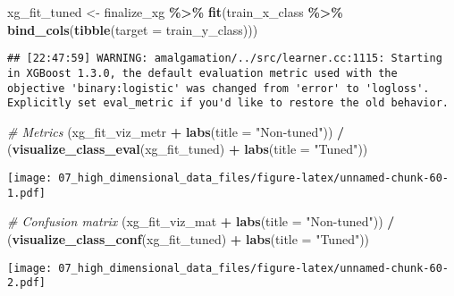 \documentclass[
]{book}
\newenvironment{Shaded}{\begin{snugshade}}{\end{snugshade}}
\newcommand{\CommentTok}[1]{\textcolor[rgb]{0.56,0.35,0.01}{\textit{#1}}}
\newcommand{\DataTypeTok}[1]{\textcolor[rgb]{0.13,0.29,0.53}{#1}}
\newcommand{\KeywordTok}[1]{\textcolor[rgb]{0.13,0.29,0.53}{\textbf{#1}}}
\newcommand{\NormalTok}[1]{#1}
\newcommand{\OperatorTok}[1]{\textcolor[rgb]{0.81,0.36,0.00}{\textbf{#1}}}
\newcommand{\StringTok}[1]{\textcolor[rgb]{0.31,0.60,0.02}{#1}}
\begin{document}
\begin{Shaded}
\begin{Highlighting}[]
\NormalTok{xg\_fit\_tuned \textless{}{-}}\StringTok{ }\NormalTok{finalize\_xg }\OperatorTok{\%\textgreater{}\%}
\StringTok{  }\KeywordTok{fit}\NormalTok{(train\_x\_class }\OperatorTok{\%\textgreater{}\%}\StringTok{ }\KeywordTok{bind\_cols}\NormalTok{(}\KeywordTok{tibble}\NormalTok{(}\DataTypeTok{target =}\NormalTok{ train\_y\_class)))}
\end{Highlighting}
\end{Shaded}

\begin{verbatim}
## [22:47:59] WARNING: amalgamation/../src/learner.cc:1115: Starting in XGBoost 1.3.0, the default evaluation metric used with the objective 'binary:logistic' was changed from 'error' to 'logloss'. Explicitly set eval_metric if you'd like to restore the old behavior.
\end{verbatim}

\begin{Shaded}
\begin{Highlighting}[]
\CommentTok{\# Metrics}
\NormalTok{(xg\_fit\_viz\_metr }\OperatorTok{+}\StringTok{ }\KeywordTok{labs}\NormalTok{(}\DataTypeTok{title =} \StringTok{"Non{-}tuned"}\NormalTok{)) }\OperatorTok{/}\StringTok{ }\NormalTok{(}\KeywordTok{visualize\_class\_eval}\NormalTok{(xg\_fit\_tuned) }\OperatorTok{+}\StringTok{ }\KeywordTok{labs}\NormalTok{(}\DataTypeTok{title =} \StringTok{"Tuned"}\NormalTok{))}
\end{Highlighting}
\end{Shaded}

\texttt{[image: 07\_high\_dimensional\_data\_files/figure-latex/unnamed-chunk-60-1.pdf]}

\begin{Shaded}
\begin{Highlighting}[]
\CommentTok{\# Confusion matrix}
\NormalTok{(xg\_fit\_viz\_mat }\OperatorTok{+}\StringTok{ }\KeywordTok{labs}\NormalTok{(}\DataTypeTok{title =} \StringTok{"Non{-}tuned"}\NormalTok{)) }\OperatorTok{/}\StringTok{ }\NormalTok{(}\KeywordTok{visualize\_class\_conf}\NormalTok{(xg\_fit\_tuned) }\OperatorTok{+}\StringTok{ }\KeywordTok{labs}\NormalTok{(}\DataTypeTok{title =} \StringTok{"Tuned"}\NormalTok{))}
\end{Highlighting}
\end{Shaded}

\texttt{[image: 07\_high\_dimensional\_data\_files/figure-latex/unnamed-chunk-60-2.pdf]}
\end{document}
